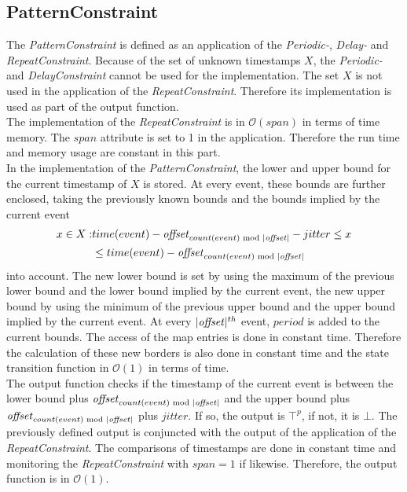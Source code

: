 \subsection{PatternConstraint}
	The \emph{PatternConstraint} is defined as an application of the \emph{Periodic-}, \emph{Delay-} and \emph{RepeatConstraint}. Because of the set of unknown timestamps $X$, the \emph{Periodic-} and \emph{DelayConstraint} cannot be used for the implementation. The set $X$ is not used in the application of the \emph{RepeatConstraint}. Therefore its implementation is used as part of the output function.\\
	The implementation of the \emph{RepeatConstraint} is in $\mathcal{O}(span)$ in terms of time memory. The $span$ attribute is set to 1 in the application. Therefore the run time and memory usage are constant in this part.\\
	In the implementation of the \emph{PatternConstraint}, the lower and upper bound for the current timestamp of $X$ is stored. At every event, these bounds are further enclosed, taking the previously known bounds and the bounds implied by the current event
	\begin{align}
		x\in X: &time(event)-\text{\emph{offset}}_{count(event)\text{ mod }|\text{\emph{offset}}|}-jitter \leq x\\
			     &\leq  time(event)-\text{\emph{offset}}_{count(event)\text{ mod }|\text{\emph{offset}}|}
	\end{align}
	into account. The new lower bound is set by using the maximum of the previous lower bound and the lower bound implied by the current event, the new upper bound by using the minimum of the previous upper bound and the upper bound implied by the current event. At every $|\text{\emph{offset}}|^{th}$ event, $period$ is added to the current bounds. The access of the map entries is done in constant time. Therefore the calculation of these new borders is also done in constant time and the state transition function in $\mathcal{O}(1)$ in terms of time.\\
	The output function checks if the timestamp of the current event is between the lower bound plus $\text{\emph{offset}}_{count(event)\text{ mod }|\text{\emph{offset}}|}$ and the upper bound plus \\$\text{\emph{offset}}_{count(event)\text{ mod }|\text{\emph{offset}}|}$ plus $jitter$. If so, the output is $\top^p$, if not, it is $\bot$. The previously defined output is conjuncted with the output of the application of the \textit{RepeatConstraint}. The comparisons of timestamps are done in constant time and monitoring the \textit{RepeatConstraint} with $span=1$ if likewise. Therefore, the output function is in $\mathcal{O}(1)$.\\
